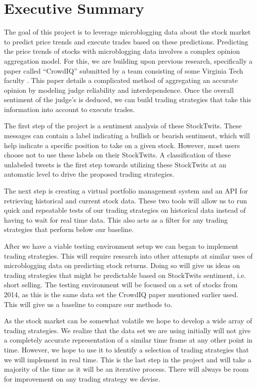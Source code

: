 
\section{Executive Summary}

The goal of this project is to leverage microblogging data about the stock market to predict price trends and execute trades based on these predictions. Predicting the price trends of stocks with microblogging data involves a complex opinion aggregation model. For this, we are building upon previous research, specifically a paper called ``CrowdIQ'' submitted by a team consisting of some Virginia Tech faculty \cite{crowdiq}. This paper details a complicated method of aggregating an accurate opinion by modeling judge reliability and interdependence. Once the overall sentiment of the judge's is deduced, we can build trading strategies that take this information into account to execute trades.

The first step of the project is a sentiment analysis of these StockTwits. These messages can contain a label indicating a bullish or bearish sentiment, which will help indicate a specific position to take on a given stock. However, most users choose not to use these labels on their StockTwits. A classification of these unlabeled tweets is the first step towards utilizing these StockTwits at an automatic level to drive the proposed trading strategies.

The next step is creating a virtual portfolio management system and an API for retrieving historical and current stock data. These two tools will allow us to run quick and repeatable tests of our trading strategies on historical data instead of having to wait for real time data. This also acts as a filter for any trading strategies that perform below our baseline.

After we have a viable testing environment setup we can began to implement trading strategies. This will require research into other attempts at similar uses of microblogging data on predicting stock returns. Doing so will give us ideas on trading strategies that might be predictable based on StockTwits sentiment, i.e. short selling. The testing environment will be focused on a set of stocks from 2014, as this is the same data set the CrowdIQ paper mentioned earlier used. This will give us a baseline to compare our methods to.

As the stock market can be somewhat volatile we hope to develop a wide array of trading strategies. We realize that the data set we are using initially will not give a completely accurate representation of a similar time frame at any other point in time. However, we hope to use it to identify a selection of trading strategies that we will implement in real time. This is the last step in the project and will take a majority of the time as it will be an iterative process. There will always be room for improvement on any trading strategy we devise.

